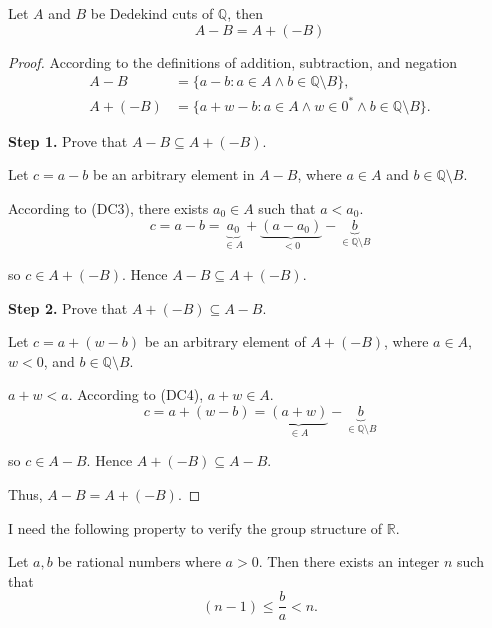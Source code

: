 \begin{theorem}\label{theorem:chapter1:negation-and-subtraction}
    Let $A$ and $B$ be Dedekind cuts of $\mathbb{Q}$, then
    \[
        A - B = A + (-B)
    \]
\end{theorem}

\begin{proof}
    According to the definitions of addition, subtraction, and negation
    \begin{align*}
        A - B    & = \{ a - b : a\in A\land b\in\mathbb{Q}\setminus B \},                      \\
        A + (-B) & = \{ a + w - b : a\in A\land w\in{0}^{*}\land b\in\mathbb{Q}\setminus B \}.
    \end{align*}

    \textbf{Step 1.} Prove that $A - B\subseteq A + (-B)$.

    Let $c = a - b$ be an arbitrary element in $A - B$, where $a\in A$ and $b\in\mathbb{Q}\setminus B$.

    According to (DC3), there exists $a_{0}\in A$ such that $a < a_{0}$.
    \[
        c = a - b = \underbrace{a_{0}}_{\in A} + \underbrace{(a - a_{0})}_{< 0} - \underbrace{b}_{\in\mathbb{Q}\setminus B}
    \]

    so $c\in A + (-B)$. Hence $A - B\subseteq A + (-B)$.
    \bigskip

    \textbf{Step 2.} Prove that $A + (-B)\subseteq A - B$.

    Let $c = a + (w - b)$ be an arbitrary element of $A + (-B)$, where $a\in A$, $w < 0$, and $b\in\mathbb{Q}\setminus B$.

    $a + w < a$. According to (DC4), $a + w\in A$.
    \[
        c = a + (w - b) = \underbrace{(a + w)}_{\in A} - \underbrace{b}_{\in\mathbb{Q}\setminus B}
    \]

    so $c\in A - B$. Hence $A + (-B)\subseteq A - B$.
    \bigskip

    Thus, $A - B = A + (-B)$.
\end{proof}

I need the following property to verify the group structure of $\mathbb{R}$.

\begin{lemma}
    Let $a, b$ be rational numbers where $a > 0$. Then there exists an integer $n$ such that
    \[
        (n - 1)\le \frac{b}{a} < n.
    \]
\end{lemma}

